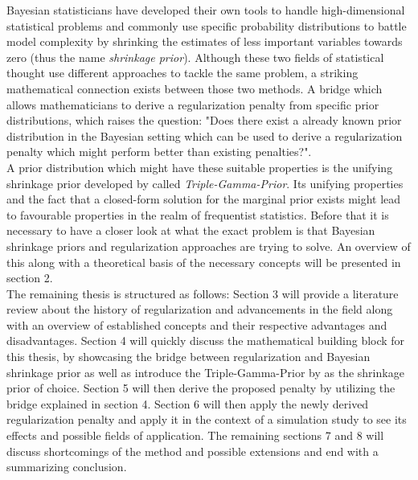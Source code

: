 \documentclass[12pt,a4paper]{article}
\begin{document}
Bayesian statisticians have developed their own tools to handle high-dimensional statistical problems and commonly use specific probability distributions to battle model complexity by shrinking the estimates of less important variables towards zero (thus the name \textit{shrinkage prior}). Although these two fields of statistical thought use different approaches to tackle the same problem, a striking mathematical connection exists between those two methods. A bridge which allows mathematicians to derive a regularization penalty from specific prior distributions, which raises the question: "Does there exist a already known prior distribution in the Bayesian setting which can be used to derive a regularization penalty which might perform better than existing penalties?".\\

A prior distribution which might have these suitable properties is the unifying shrinkage prior developed by \textcite{TGP2020} called \textit{Triple-Gamma-Prior}. Its unifying properties and the fact that a closed-form solution for the marginal prior exists might lead to favourable properties in the realm of frequentist statistics. Before that it is necessary to have a closer look at what the exact problem is that Bayesian shrinkage priors and regularization approaches are trying to solve. An overview of this along with a theoretical basis of the necessary concepts will be presented in section 2.\\

The remaining thesis is structured as follows: Section 3 will provide a literature review about the history of regularization and advancements in the field along with an overview of established concepts and their respective advantages and disadvantages. Section 4 will quickly discuss the mathematical building block for this thesis, by showcasing the bridge between regularization and Bayesian shrinkage prior as well as introduce the Triple-Gamma-Prior by \textcite{TGP2020} as the shrinkage prior of choice. Section 5 will then derive the proposed penalty by utilizing the bridge explained in section 4. Section 6 will then apply the newly derived regularization penalty and apply it in the context of a simulation study to see its effects and possible fields of application. The remaining sections 7 and 8 will discuss shortcomings of the method and possible extensions and end with a summarizing conclusion. 

\newpage
\end{document}
